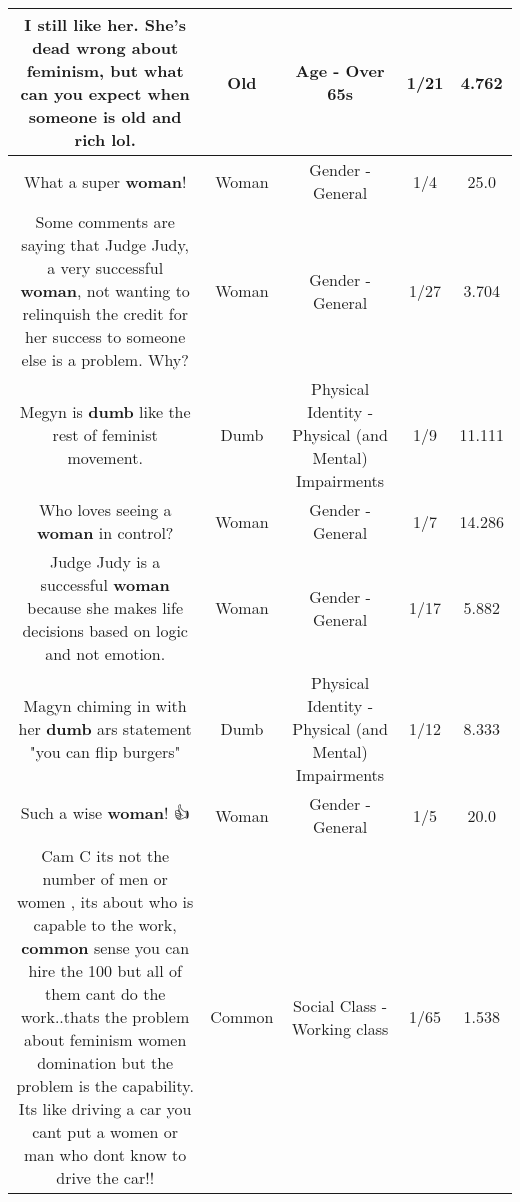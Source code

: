 \documentclass[11pt]{article}
\newlength\mylength
\begin{document}
\begin{center}
\begin{longtable}{|C{.65\mylength}|C{.30\mylength}|C{.12\mylength}|C{.12\mylength}|C{.12\mylength}|}
  \small I still like her. She's dead wrong about feminism, but what can you expect when someone is \textbf{old} and rich lol.\normalsize   & Old & Age - Over 65s & 1/21 & 4.762 \\  \hline
  \small What a super \textbf{woman}!\normalsize   & Woman & Gender - General & 1/4 & 25.0 \\  \hline
  \small Some comments are saying that Judge Judy, a very successful \textbf{woman}, not wanting to relinquish the credit for her success to someone else is a problem. Why?\normalsize   & Woman & Gender - General & 1/27 & 3.704 \\  \hline
  \small Megyn is \textbf{dumb} like the rest of feminist movement.\normalsize   & Dumb & Physical Identity - Physical (and Mental) Impairments & 1/9 & 11.111 \\  \hline
  \small Who loves seeing a \textbf{woman} in control?\normalsize   & Woman & Gender - General & 1/7 & 14.286 \\  \hline
  \small Judge Judy is a successful \textbf{woman} because she makes life decisions based on logic and not emotion.\normalsize   & Woman & Gender - General & 1/17 & 5.882 \\  \hline
  \small Magyn chiming in with her \textbf{dumb} ars statement "you can flip burgers"\normalsize   & Dumb & Physical Identity - Physical (and Mental) Impairments & 1/12 & 8.333 \\  \hline
  \small Such a wise \textbf{woman}! 👍\normalsize   & Woman & Gender - General & 1/5 & 20.0 \\  \hline
  \small Cam C its not the number of men or women , its about who is capable to the work, \textbf{common} sense you can hire the 100 but all of them cant do the work..thats the problem about feminism women domination but the problem is the capability. Its like driving a car you cant put a women or man who dont know to drive the car!!\normalsize   & Common & Social Class - Working class & 1/65 & 1.538 \\  \hline

\end{longtable}
\end{center}
\end{document}
